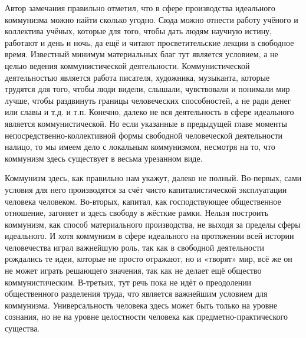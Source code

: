 \documentclass[12pt,a4paper,openany]{book}
\begin{document}
Автор замечания правильно отметил, что в сфере производства идеального коммунизма можно найти сколько угодно. Сюда можно отнести работу учёного и коллектива учёных, которые для того, чтобы дать людям научную истину, работают и день и ночь, да ещё и читают просветительские лекции в свободное время. Известный минимум материальных благ тут является условием, а не целью ведения коммунистической деятельности. Коммунистической деятельностью является работа писателя, художника, музыканта, которые трудятся для того, чтобы люди видели, слышали, чувствовали и понимали мир лучше, чтобы раздвинуть границы человеческих способностей, а не ради денег или славы и т.д. и т.п. Конечно, далеко не вся деятельность в сфере идеального является коммунистической. Но если указанные в предыдущей главе моменты непосредственно-коллективной формы свободной человеческой деятельности налицо, то мы имеем дело с локальным коммунизмом, несмотря на то, что коммунизм здесь существует в весьма урезанном виде.

Коммунизм здесь, как правильно нам укажут, далеко не полный. Во-первых, сами условия для него производятся за счёт чисто капиталистической эксплуатации человека человеком. Во-вторых, капитал, как господствующее общественное отношение, загоняет и здесь свободу в жёсткие рамки. Нельзя построить коммунизм, как способ материального производства, не выходя за пределы сферы идеального. И хотя коммунизм в сфере идеального на протяжении всей истории человечества играл важнейшую роль, так как в свободной деятельности рождались те идеи, которые не просто отражают, но и «творят» мир, всё же он не может играть решающего значения, так как не делает ещё общество коммунистическим. В-третьих, тут речь пока не идёт о преодолении общественного разделения труда, что является важнейшим условием для коммунизма. Универсальность человека здесь может быть только на уровне сознания, но не на уровне целостности человека как предметно-практического существа.
\end{document}
